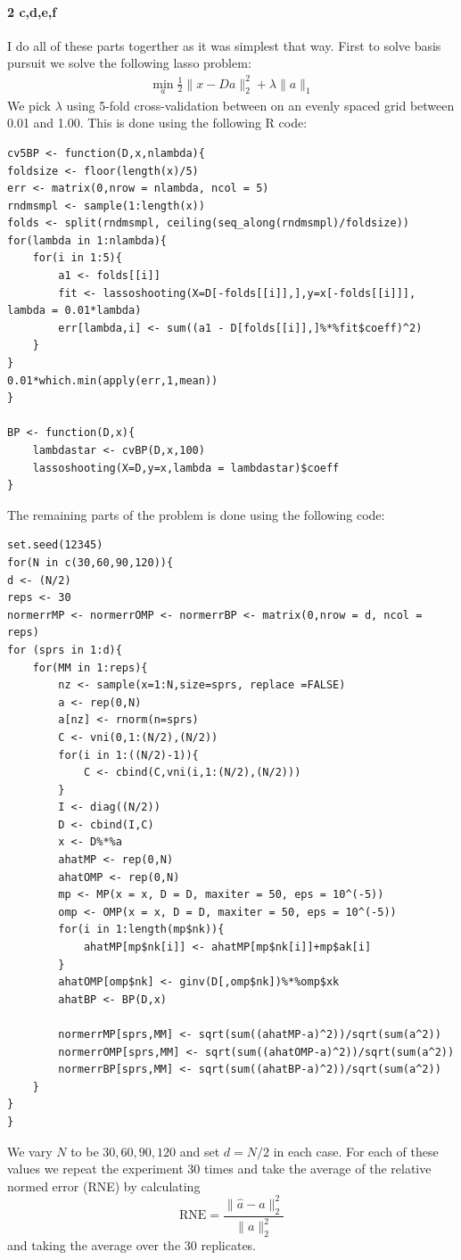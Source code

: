 \documentclass[12pt, leqno]{article}
\providecommand{\norm}[1]{\lVert#1\rVert} %
\begin{document}
\paragraph{2 c,d,e,f}
I do all of these parts togerther as it was simplest that way. First to solve basis pursuit we solve the following lasso problem:
\begin{align*}
\min_{a} \frac{1}{2} \norm{x-Da}_2^2 + \lambda \norm{a}_1
\end{align*}
We pick $\lambda$ using 5-fold cross-validation between on an evenly spaced grid between 0.01 and 1.00. This is done using the following R code:
\begin{verbatim}
cv5BP <- function(D,x,nlambda){
foldsize <- floor(length(x)/5)    
err <- matrix(0,nrow = nlambda, ncol = 5)
rndmsmpl <- sample(1:length(x))
folds <- split(rndmsmpl, ceiling(seq_along(rndmsmpl)/foldsize))
for(lambda in 1:nlambda){
    for(i in 1:5){
        a1 <- folds[[i]]
        fit <- lassoshooting(X=D[-folds[[i]],],y=x[-folds[[i]]],
lambda = 0.01*lambda)
        err[lambda,i] <- sum((a1 - D[folds[[i]],]%*%fit$coeff)^2)
    }
}
0.01*which.min(apply(err,1,mean))
}

BP <- function(D,x){
    lambdastar <- cvBP(D,x,100)
    lassoshooting(X=D,y=x,lambda = lambdastar)$coeff
}
\end{verbatim}

The remaining parts of the problem is done using the following code:
\begin{verbatim}
set.seed(12345)
for(N in c(30,60,90,120)){
d <- (N/2)
reps <- 30
normerrMP <- normerrOMP <- normerrBP <- matrix(0,nrow = d, ncol = reps)
for (sprs in 1:d){
    for(MM in 1:reps){
        nz <- sample(x=1:N,size=sprs, replace =FALSE)
        a <- rep(0,N)
        a[nz] <- rnorm(n=sprs)
        C <- vni(0,1:(N/2),(N/2))
        for(i in 1:((N/2)-1)){
            C <- cbind(C,vni(i,1:(N/2),(N/2)))
        }
        I <- diag((N/2))
        D <- cbind(I,C)
        x <- D%*%a
        ahatMP <- rep(0,N)
        ahatOMP <- rep(0,N)
        mp <- MP(x = x, D = D, maxiter = 50, eps = 10^(-5))
        omp <- OMP(x = x, D = D, maxiter = 50, eps = 10^(-5))
        for(i in 1:length(mp$nk)){
            ahatMP[mp$nk[i]] <- ahatMP[mp$nk[i]]+mp$ak[i]
        }
        ahatOMP[omp$nk] <- ginv(D[,omp$nk])%*%omp$xk
        ahatBP <- BP(D,x)
        
        normerrMP[sprs,MM] <- sqrt(sum((ahatMP-a)^2))/sqrt(sum(a^2))
        normerrOMP[sprs,MM] <- sqrt(sum((ahatOMP-a)^2))/sqrt(sum(a^2))
        normerrBP[sprs,MM] <- sqrt(sum((ahatBP-a)^2))/sqrt(sum(a^2))
    }
}
}
\end{verbatim}
We vary $N$ to be $30,60,90, 120$ and set $d = N/2$ in each case. For each of these values we repeat the experiment 30 times and take the average of the relative normed error (RNE) by calculating 
$$
\text{RNE} = \frac{\norm{\hat{a}-a}_2^2}{\norm{a}_2^2} 
$$
and taking the average over the 30 replicates. 
\end{document}
